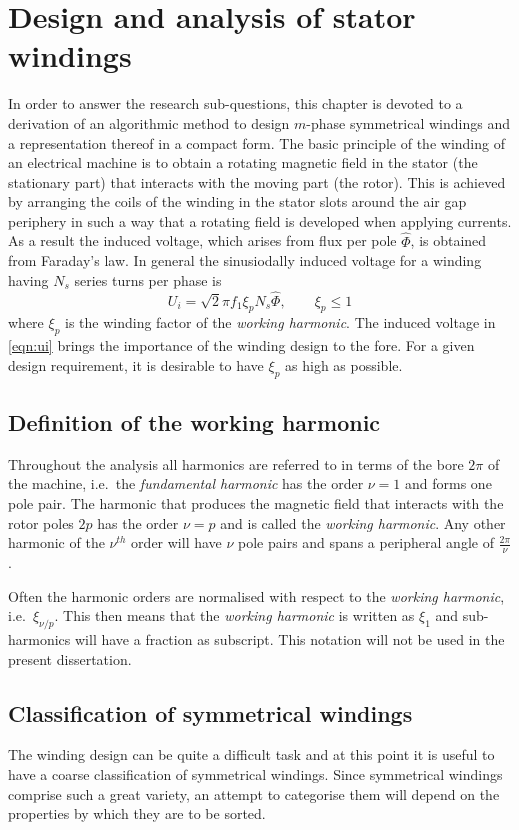 \chapter{Design and analysis of stator windings}
\label{chap:DesignWindings}
In order to answer the research sub-questions, this chapter is devoted to a derivation of an algorithmic method to design $m$-phase symmetrical windings and a representation thereof in a compact form. The basic principle of the winding of an electrical machine is to obtain a rotating magnetic field in the stator (the stationary part) that interacts with the moving part (the rotor). This is achieved by arranging the coils of the winding in the stator slots around the air gap periphery in such a way that a rotating field is developed when applying currents. As a result the induced voltage, which arises from flux per pole $\hat{\Phi}$, is obtained from Faraday's law. In general the sinusiodally induced voltage for a winding having $N_s$ series turns per phase is
\begin{equation}
  \label{eqn:ui}
  U_i = \sqrt{2} \pi f_1 \xi_p N_s \hat{\Phi}, \qquad \xi_p \leq 1
\end{equation}
where $\xi_p$ is the winding factor of the \textit{working harmonic}. The induced voltage in \eqref{eqn:ui} brings the importance of the winding design to the fore. For a given design requirement, it is desirable to have $\xi_p$ as high as possible.

\section{Definition of the working harmonic}\label{sec:working_harmonic}
Throughout the analysis all harmonics are referred to in terms of the bore $2\pi$ of the machine, i.e.~the \textit{fundamental harmonic} has the order $\nu=1$ and forms one pole pair. The harmonic that produces the magnetic field that interacts with the rotor poles $2p$ has the order $\nu=p$ and is called the \textit{working harmonic}. Any other harmonic of the $\nu^{th}$ order will have $\nu$ pole pairs and spans a peripheral angle of $\frac{2\pi}{\nu}$.

Often the harmonic orders are normalised with respect to the \textit{working harmonic}, i.e.~$\xi_{\nu /p}$. This then means that the \textit{working harmonic} is written as $\xi_1$ and sub-harmonics will have a fraction as subscript. This notation will not be used in the present dissertation.

\section{Classification of symmetrical windings}%
\label{sec:m_phases}
The winding design can be quite a difficult task and at this point it is useful to have a coarse classification of symmetrical windings. Since symmetrical windings comprise such a great variety, an attempt to categorise them will depend on the properties by which they are to be sorted. 

